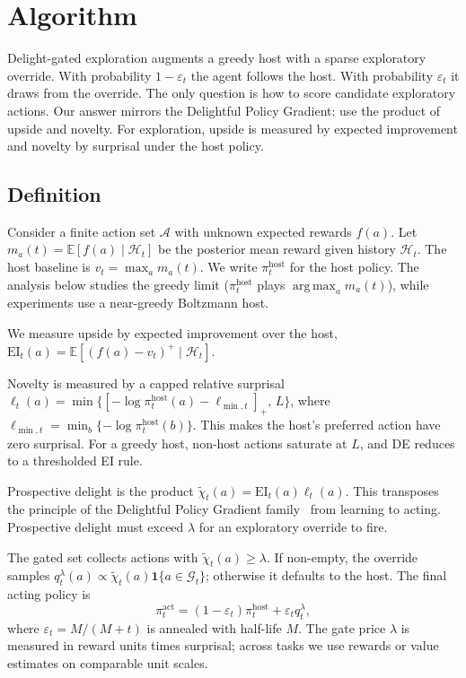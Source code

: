 \documentclass{article}
\DeclareMathOperator*{\argmax}{arg\,max}
\newcommand{\Gc}{\mathcal{G}}
\newcommand{\Ac}{\mathcal{A}}
\newcommand{\Hc}{\mathcal{H}}
\newcommand{\E}{\mathbb{E}}
\newcommand{\one}{\mathbf{1}}
\newcommand{\surp}{\ell} %
\newcommand{\delight}{\chi} %
\newcommand{\EI}{\mathrm{EI}} %
\begin{document}
\section{Algorithm}
\label{sec:algorithm}

Delight-gated exploration augments a greedy host with a sparse exploratory override.
With probability $1-\varepsilon_t$ the agent follows the host.
With probability $\varepsilon_t$ it draws from the override.
The only question is how to score candidate exploratory actions.
Our answer mirrors the Delightful Policy Gradient: use the product of upside and novelty.
For exploration, upside is measured by expected improvement and novelty by surprisal under the host policy.

\subsection{Definition}
\label{sec:definition}

Consider a finite action set $\Ac$ with unknown expected rewards $f(a)$.
Let $m_a(t) = \E[f(a)\mid\Hc_t]$ be the posterior mean reward given history $\Hc_t$.
The host baseline is $v_t = \max_a m_a(t)$.
We write $\pi_t^{\mathrm{host}}$ for the host policy.
The analysis below studies the greedy limit ($\pi_t^{\mathrm{host}}$ plays $\argmax_a m_a(t)$), while experiments use a near-greedy Boltzmann host.

We measure upside by expected improvement over the host, $\EI_t(a) = \E[(f(a)-v_t)^+\mid\Hc_t]$.

Novelty is measured by a capped relative surprisal $\surp_t(a) = \min\{[-\log \pi_t^{\mathrm{host}}(a)-\ell_{\min,t}]_+,\,L\}$, where $\ell_{\min,t} = \min_b\{-\log \pi_t^{\mathrm{host}}(b)\}$.
This makes the host's preferred action have zero surprisal.
For a greedy host, non-host actions saturate at $L$, and DE reduces to a thresholded EI rule.

Prospective delight is the product $\tilde{\delight}_t(a) = \EI_t(a)\surp_t(a)$.
This transposes the principle of the Delightful Policy Gradient family~\citep{osband2026delightfulpolicygradient,osband2026doesgradientsparkjoy} from learning to acting.
Prospective delight must exceed $\lambda$ for an exploratory override to fire.

The gated set collects actions with $\tilde{\delight}_t(a)\ge\lambda$.
If non-empty, the override samples $q_t^\lambda(a)\propto \tilde{\delight}_t(a)\one\{a\in\Gc_t\}$; otherwise it defaults to the host.
The final acting policy is
\begin{equation}
\label{eq:acting}
\pi_t^{\mathrm{act}} = (1-\varepsilon_t)\pi_t^{\mathrm{host}} + \varepsilon_t q_t^\lambda,
\end{equation}
where $\varepsilon_t = M/(M+t)$ is annealed with half-life $M$.
The gate price $\lambda$ is measured in reward units times surprisal; across tasks we use rewards or value estimates on comparable unit scales.
\end{document}
